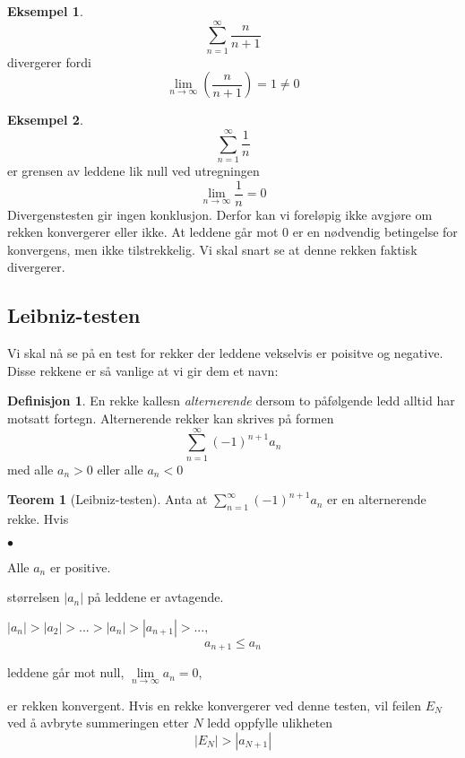 \documentclass[11pt]{article}
\theoremstyle{definition}
\newtheorem{mindef}{Definisjon}[section]
\newenvironment{fmindef}
{\begin{mdframed}[style=minstil]\begin{mindef}}
		{\end{mindef}\end{mdframed}}
\theoremstyle{definition}
\newtheorem{mitteks}{Eksempel}[section]
\theoremstyle{definition}
\theoremstyle{definition}
\newtheorem{teo}{Teorem}[section]
\newenvironment{fteo}
{\begin{mdframed}[style=minstil]\begin{teo}}
		{\end{teo}\end{mdframed}}
\theoremstyle{definition}
\theoremstyle{definition}
\begin{document}
		\begin{mitteks}
			\[\displaystyle{\sum_{n=1}^{\infty}\dfrac{n}{n+1}}\] divergerer fordi \[\lim\limits_{n \rightarrow \infty}\left(\dfrac{n}{n+1}\right)=1\neq 0 \]
		\end{mitteks}
		
		\newpage
		
		\begin{mitteks}
			\[\sum_{n=1}^{\infty}\dfrac{1}{n}\] er grensen av leddene lik null ved utregningen
			\[\lim\limits_{n \rightarrow \infty}\dfrac{1}{n}=0 \]
			Divergenstesten gir ingen konklusjon. Derfor kan vi foreløpig ikke avgjøre om rekken konvergerer eller ikke. At leddene går mot 0 er en nødvendig betingelse for konvergens, men ikke tilstrekkelig. Vi skal snart se at denne rekken faktisk divergerer.
		\end{mitteks}
		
		\newpage
		
		\subsection{Leibniz-testen}
		Vi skal nå se på en test for rekker der leddene vekselvis er poisitve og negative. Disse rekkene er så vanlige at vi gir dem et navn:
		\begin{fmindef}
			En rekke kallesn \textit{alternerende} dersom to påfølgende ledd alltid har motsatt fortegn. Alternerende rekker kan skrives på formen \[\displaystyle{\sum_{n=1}^{\infty}(-1)^{n+1}a_n}\]
			med alle \(a_n>0\) eller alle \(a_n<0\)
		\end{fmindef}
		
		
		\begin{fteo}[Leibniz-testen] 
			Anta at \(\displaystyle{\sum_{n=1}^{\infty}(-1)^{n+1}}a_n\) er en alternerende rekke. Hvis
			\begin{list}{\(\bullet\)} \leavevmode
				\item Alle \(a_n\) er positive.
				\item størrelsen \(|a_n|\) på leddene er avtagende.
				 
				 \(|a_n|>|a_2|>...>|a_n|>|a_{n+1}|>...,\) \[a_{n+1}\leq a_n \]
				\item leddene går mot null, \(\lim\limits_{n \rightarrow \infty}a_n=0\),
			\end{list}
			er rekken konvergent. Hvis en rekke konvergerer ved denne testen, vil feilen \(E_N\) ved å avbryte summeringen etter \(N\) ledd oppfylle ulikheten \[|E_N|>|a_{N+1}|\]
		\end{fteo}
		
\end{document}
